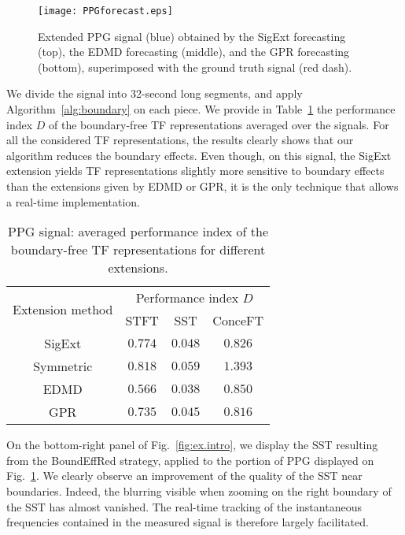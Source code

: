 \begin{figure}
\texttt{[image: PPGforecast.eps]}
\caption{Extended PPG signal (blue) obtained by the {\sf SigExt} forecasting (top), the EDMD forecasting (middle), and the GPR forecasting (bottom), superimposed with the ground truth signal (red dash).}
\label{fig:ppg}
\end{figure}

We divide the signal into 32-second long segments, and apply Algorithm~\ref{alg:boundary} on each piece. We provide in Table~\ref{tab:otd.ppg} the performance index $D$ of the boundary-free TF representations averaged over the signals. For all the considered TF representations, the results clearly shows that our algorithm reduces the boundary effects. %
Even though, on this signal, the {\sf SigExt} extension yields TF representations slightly more sensitive to boundary effects than the extensions given by EDMD or GPR, it is the only technique that allows a real-time implementation.

\begin{table}
\centering
\caption{PPG signal: averaged performance index of the boundary-free TF representations for different extensions.}
\begin{tabular}{|c||c|c|c|}
  \hline
   \multirow{2}{*}{Extension method} & \multicolumn{3}{c|}{Performance index $D$} \\
   \cline{2-4}
      & STFT & SST & ConceFT\\
   \hhline{|=#=|=|=|}
   {\sf SigExt} & $0.774$ & $0.048$ & $0.826$ \\
   \hline
   Symmetric & $0.818$ & $0.059$ & $1.393$ \\
   \hline
   EDMD & $0.566$ & $0.038$ & $0.850$ \\
   \hline
   GPR & $0.735$ & $0.045$ & $0.816$ \\
   \hline
\end{tabular}
\label{tab:otd.ppg}
\end{table}

On the bottom-right panel of Fig.~\ref{fig:ex.intro}, we display the SST resulting from the {\sf BoundEffRed} strategy, applied to the portion of PPG displayed on Fig.~\ref{fig:ppg}. We clearly observe an improvement of the quality of the SST near boundaries. Indeed, the blurring visible when zooming on the right boundary of the SST has almost vanished. The real-time tracking of the instantaneous frequencies contained in the measured signal is therefore largely facilitated.

